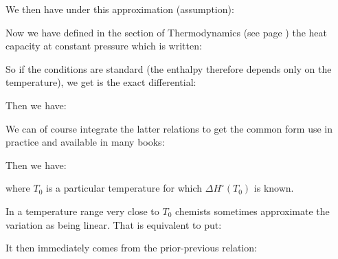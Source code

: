 	We then have under this approximation (assumption):
	
	Now we have defined in the section of Thermodynamics (see page \pageref{calorific capacities}) the heat capacity at constant pressure which is written:
	
	So if the conditions are standard (the enthalpy therefore depends only on the temperature), we get is the exact differential:
	
	Then we have:
	
	We can of course integrate the latter relations to get the common form use in practice and available in many books:
	
	Then we have:
	
	where $T_0$ is a particular temperature for which $\Delta H^\circ (T_0)$ is known.

	In a temperature range very close to $T_0$ chemists sometimes approximate the variation as being linear. That is equivalent to put:
	
	It then immediately comes from the prior-previous relation:
	
